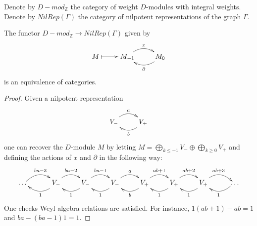 Denote by $D-mod_\mathbb{Z}$ the category of weight $D$-modules with integral weights. Denote by $NilRep(\Gamma)$ the category of nilpotent representations of the graph $\Gamma$.
\begin{theorem}
The functor $D-mod_\mathbb{Z}\to NilRep(\Gamma)$ given by $$  \xymatrix{M\ar@{|->}[r]&M_{-1} \ar@/^1.0pc/@[black][r]^{x} 
  & M_0  \ar@/^1.0pc/@[black][l]^{\partial}}$$ is an equivalence of categories.
\end{theorem}

\begin{proof}
Given a nilpotent representation $$\xymatrix{V_- \ar@/^1.0pc/@[black][r]^{a} & V_+  \ar@/^1.0pc/@[black][l]^{b}}$$ one can recover the $D$-module $M$ by letting $\displaystyle M=\bigoplus_{k\le -1}V_- \oplus \bigoplus_{k\ge 0} V_+ $ and defining the actions of $x$ and $\partial$ in the following way:
$$
\xymatrix{\dots~~ \ar@/^1.0pc/@[black][r]^{ba-3}&
V_- \ar@/^1.0pc/@[black][r]^{ba-2}
\ar@/^1.0pc/@[black][l]^{1}
  & V_-   \ar@/^1.0pc/@[black][l]^{1} \ar@/^1.0pc/@[black][r]^{ba-1}
  & V_-  \ar@/^1.0pc/@[black][l]^{1} \ar@/^1.0pc/@[black][r]^{a}
  & V_+ \ar@/^1.0pc/@[black][l]^{b}
  \ar@/^1.0pc/@[black][r]^{ab+1}
  & V_+ \ar@/^1.0pc/@[black][l]^{1}
  \ar@/^1.0pc/@[black][r]^{ab+2} 
  & V_+ \ar@/^1.0pc/@[black][l]^{1}
  \ar@/^1.0pc/@[black][r]^{ab+3} 
  & ~\dots \ar@/^1.0pc/@[black][l]^{1}
  }
$$
One checks Weyl algebra relations are satisfied. For instance, $ 1 (ab+1) - a b = 1$ and $b a - (ba-1)1 = 1$.
\end{proof}

